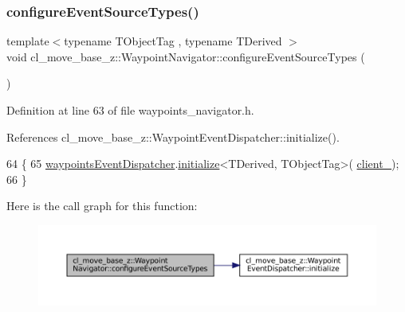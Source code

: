 \subsubsection{\texorpdfstring{configure\+Event\+Source\+Types()}{configureEventSourceTypes()}}
{\footnotesize\ttfamily template$<$typename T\+Object\+Tag , typename T\+Derived $>$ \\
void cl\+\_\+move\+\_\+base\+\_\+z\+::\+Waypoint\+Navigator\+::configure\+Event\+Source\+Types (\begin{DoxyParamCaption}{ }\end{DoxyParamCaption})\hspace{0.3cm}{\ttfamily [inline]}}



Definition at line 63 of file waypoints\+\_\+navigator.\+h.



References cl\+\_\+move\+\_\+base\+\_\+z\+::\+Waypoint\+Event\+Dispatcher\+::initialize().


\begin{DoxyCode}
64   \{
65     \hyperlink{classcl__move__base__z_1_1WaypointNavigator_a4f2be7a9741e8535c414e63335d752a0}{waypointsEventDispatcher}.\hyperlink{classcl__move__base__z_1_1WaypointEventDispatcher_a89674461d32af85dd64ca49290dbd010}{initialize}<TDerived, TObjectTag>(
      \hyperlink{classcl__move__base__z_1_1WaypointNavigator_afc5ad5c5d15f41437286b8fca1d3a324}{client\_});
66   \}
\end{DoxyCode}
Here is the call graph for this function\+:
\nopagebreak
\begin{figure}[H]
\begin{center}
\leavevmode
\includegraphics[width=350pt]{classcl__move__base__z_1_1WaypointNavigator_a990251ed37b12f67f756be17ca85b242_cgraph}
\end{center}
\end{figure}
\mbox{\label{classcl__move__base__z_1_1WaypointNavigator_a753c3df56b96c49438a361d3e5234f79}} 
